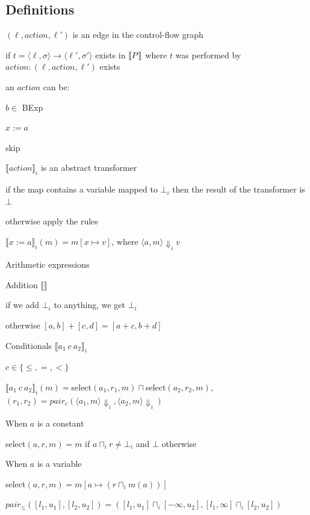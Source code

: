 \subsection{Definitions}
\enumstart
	\item $(\ell, action, \ell')$ is an edge in the control-flow graph
	\item if $t = \langle \ell, \sigma \rangle \rightarrow \langle \ell', \sigma' \rangle$ exists in $\llbracket P \rrbracket$ where $t$ was performed by $action: (\ell, action, \ell')$ exists
	\item an $action$ can be:
	\enumstart
		\item $b \in$ BExp
		\item $x := a$
		\item skip
	\enumend
	\item $\llbracket action \rrbracket_i$ is an abstract transformer
	\enumstart
		\item if the map contains a variable mapped to $\bot_i$ then the result of the transformer is $\bot$
		\item otherwise apply the rules
	\enumend
	\item $\llbracket x := a\rrbracket_i(m) = m[x \mapsto v]$, where $\langle a,m \rangle \Downarrow_i v$
	\item Arithmetic expressions
	\enumstart
		\item Addition $\llbracket \rrbracket$
		\enumstart
			\item if we add $\bot_i$ to anything, we get $\bot_i$
			\item otherwise $[a,b]+[c,d] = [a+c, b+d]$
		\enumend
	\enumend
	\item Conditionals $\llbracket a_1 \ c \ a_2 \rrbracket_i$
	\enumstart
		\item $c \in \{\le, =, < \}$
		\item $\llbracket a_1 \ c \ a_2 \rrbracket_i(m) = $select$(a_1, r_1, m) \sqcap $select$(a_2, r_2, m)$, $(r_1, r_2) = pair_c(\langle a_1, m \rangle \Downarrow_i, \langle a_2, m \rangle \Downarrow_i)$
		\item When $a$ is a constant
		\enumstart
			\item select$(a,r,m) = m$ if $a \sqcap_i r \ne \bot_i$ and $\bot$ otherwise		\enumend
		\item When $a$ is a variable
		\enumstart
			\item select$(a,r,m) = m[a \mapsto (r \sqcap_i m(a))]$
		\enumend
		\item $pair_\le([l_1, u_1], [l_2, u_2]) = ([l_1, u_1] \sqcap_i [-\infty, u_2], [l_1, \infty] \sqcap_i [l_2, u_2])$

